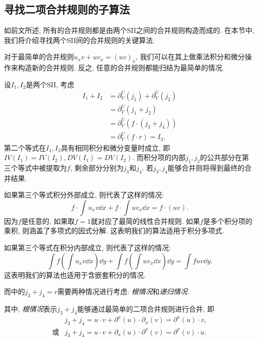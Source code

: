 \subsection{寻找二项合并规则的子算法} \label{Combine-03}
如前文所述, 所有的合并规则都是由两个SII之间的合并规则构造而成的. 在本节中, 我们将介绍寻找两个SII间的合并规则的关键算法. 

对于最简单的合并规则$u_x v + u v_x = (uv)_x$, 我们可以在其上做乘法\D 积分和微分操作来构造新的合并规则. 反之, 任意的合并规则都能归结为最简单的情况. 

设$I_1,I_2$是两个SII, 考虑 
\begin{equation}
\begin{split}
I_1+I_2 &= \partial^U_V(j_1) + \partial^U_V(j_2) \\
        &= \partial^U_V( j_1+j_2 )\\
        &= \partial^U_V( f\cdot(j_3+j_4) )\\ 
        &= \partial^U_V( f\cdot r ) = I_3 .
\end{split}
\label{combine_form}
\end{equation} 
第二个等式在$I_1,I_2$具有相同积分和微分变量时成立, 即$IV(I_1)=IV(I_2),DV(I_1)=DV(I_2)$. 而积分项的内部$j_1,j_2$的公共部分在第三个等式中被提取为$f$, 剩余部分分别为$j_3$和$j_4$. 若$j_3,j_4$能够合并则将得到最终的合并结果. 

如果第三个等式积分外部成立, 则代表了这样的情况: 
\begin{equation}
f\cdot\int\!{u_x v\dd x}+f\cdot\int\!{u v_x \dd x} = f\cdot(uv).
\end{equation} 
因为$f$是任意的, 如果取$f=1$就对应了最简的线性合并规则. 如果$f$是多个积分项的乘积, 则涵盖了多项式的因式分解. 这表明我们的算法适用于积分多项式. 

如果第三个等式在积分内部成立, 则代表了这样的情况:
\begin{equation}
\int\!{f \left(\int\!{u_x v\dd x}\right)\dd y}+\int\!{f \left(\int\!{u v_x \dd x}\right) \dd y} = \int\!{fuv\dd y}.
\end{equation}
这表明我们的算法也适用于含嵌套积分的情况. 

而中的$j_3+j_4=r$需要两种情况进行考虑: \emph{根情况}和\emph{递归情况}. 

其中, \emph{根情况}表示$j_3+j_4$能够通过最简单的二项合并规则进行合并, 即
\begin{equation}
\begin{array}{rl}
& j_3+j_4=u \cdot v+\partial^x(u)\cdot \partial_x(v) = \partial^x(u)\cdot v, \\
\text{或}& j_3+j_4=u \cdot v+\partial_x(u)\cdot \partial^x(v) = \partial^x(v)\cdot u.
\end{array}
\label{root_form}
\end{equation}

